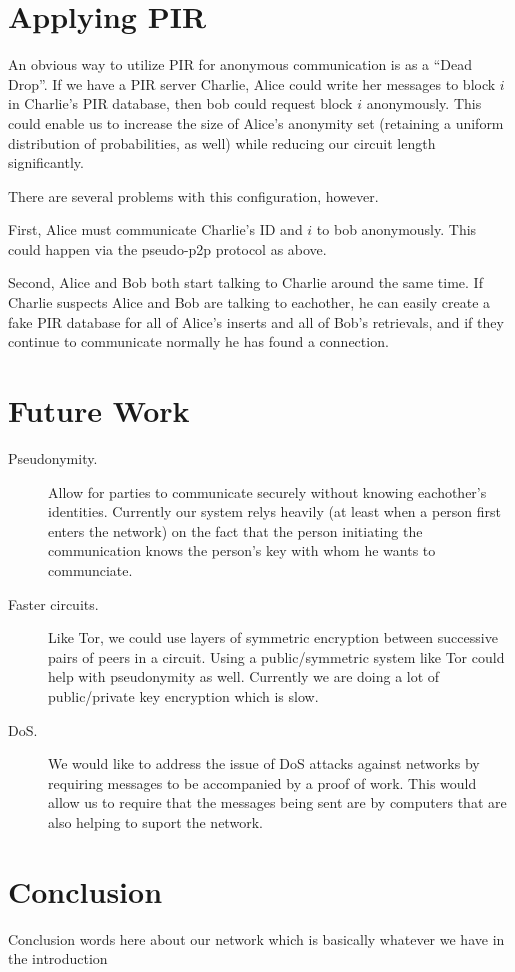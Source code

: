 \documentclass[twocolumn]{paper}
\begin{document}
\section{Applying PIR}
An obvious way to utilize PIR for anonymous communication is as a ``Dead Drop''. If we have a PIR server Charlie, Alice could write her messages to block $i$ in Charlie's PIR database, then bob could request block $i$ anonymously. This could enable us to increase the size of Alice's anonymity set (retaining a uniform distribution of probabilities, as well) while reducing our circuit length significantly. 

There are several problems with this configuration, however.

First, Alice must communicate Charlie's ID and $i$ to bob anonymously. This could happen via the pseudo-p2p protocol as above. 

Second, Alice and Bob both start talking to Charlie around the same time. If Charlie suspects Alice and Bob are talking to eachother, he can easily create a fake PIR database for all of Alice's inserts and all of Bob's retrievals, and if they continue to communicate normally he has found a connection. 


\section{Future Work}
\begin{description}
\item[Pseudonymity.] Allow for parties to communicate securely without knowing eachother's identities. Currently our system relys heavily (at least when a person first enters the network) on the fact that the person initiating the communication knows the person's key with whom he wants to communciate.

\item[Faster circuits.] Like Tor, we could use layers of symmetric encryption between successive pairs of peers in a circuit. Using a public/symmetric system like Tor could help with pseudonymity as well. Currently we are doing a lot of public/private key encryption which is slow.

\item[DoS.] We would like to address the issue of DoS attacks against networks by requiring messages to be accompanied by a proof of work. This would allow us to require that the messages being sent are by computers that are also helping to suport the network.
\end{description}

\section{Conclusion}
Conclusion words here about our network which is basically whatever we have in the introduction

\newpage



\end{document}
